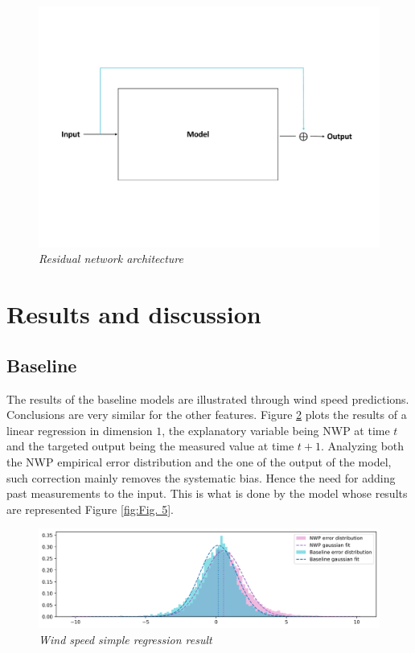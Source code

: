 \documentclass{article}
\begin{document}
\begin{figure}[H]
    \centering
    \includegraphics[width=.9\linewidth]{img/residual.pdf}
    \vspace{-30px}
    \caption{\textit{Residual network architecture}}
    \label{fig:Fig. 3}
\end{figure}


\section{Results and discussion}
\subsection*{Baseline}

The results of the baseline models are illustrated through wind speed predictions. Conclusions are very similar
for the other features. Figure \ref{fig:Fig. 4} plots the results of a linear regression in dimension $1$, the explanatory
variable being NWP at time $t$ and the targeted output being the measured value at time $t + 1$. Analyzing both
the NWP empirical error distribution and the one of the
output of the model, such correction mainly removes the systematic bias.
Hence the need for adding past measurements to the input. This is what is done by the model whose results
are represented Figure \ref{fig:Fig. 5}.


\begin{figure}[H]
    \centering
    \includegraphics[width=\linewidth]{img/base.png}
    \caption{\textit{Wind speed simple regression result}}
    \label{fig:Fig. 4}
\end{figure}
\end{document}
